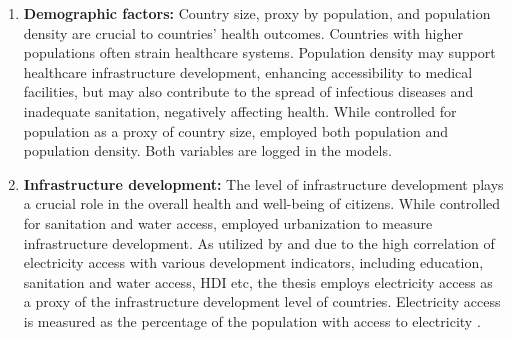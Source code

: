 \begin{enumerate}[i]
    \item \textbf{Demographic factors:} Country size, proxy by population, and population density are crucial to countries' health outcomes. Countries with higher populations often strain healthcare systems. Population density may support healthcare infrastructure development, enhancing accessibility to medical facilities, but may also contribute to the spread of infectious diseases and inadequate sanitation, negatively affecting health. While  \textcite[e.g.,][]{staicu2017study, chung_economic_2022, yogo_health_2015, doucouliagos_health_2021} controlled for population as a proxy of country size, \textcite{doucouliagos_health_2021} employed both population and population density. Both variables are logged in the models.
    
    \item \textbf{Infrastructure development:} The level of infrastructure development plays a crucial role in the overall health and well-being of citizens. While \textcite{doucouliagos_health_2021, yogo_health_2015} controlled for sanitation and water access, \textcite{odokonyero_impact_2018, yan_mortality_2015, williamson_foreign_2008} employed urbanization to measure infrastructure development. As utilized by \textcite{toseef_how_2019} and due to the high correlation of electricity access with various development indicators, including education, sanitation and water access, HDI etc, the thesis employs electricity access as a proxy of the infrastructure development level of countries.  Electricity access is measured as the percentage of the population with access to electricity \textcite{wdi_world_2023}. 
    

\end{enumerate}
